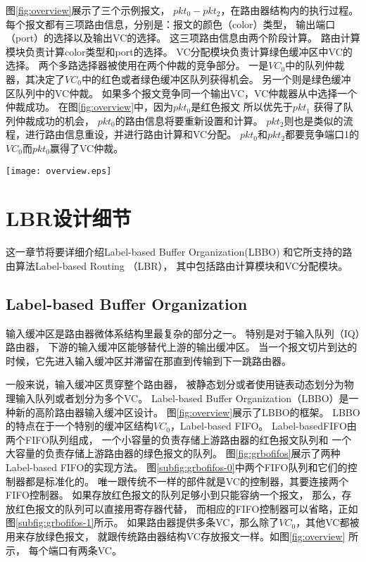 图\ref{fig:overview}展示了三个示例报文，
$pkt_0-pkt_2$，在路由器结构内的执行过程。
每个报文都有三项路由信息，分别是：报文的颜色（color）类型，
输出端口（port）的选择以及输出VC的选择。
这三项路由信息由两个阶段计算。
路由计算模块负责计算color类型和port的选择。
VC分配模块负责计算绿色缓冲区中VC的选择。
两个多路选择器被使用在两个仲裁的竞争部分。
一是$VC_0$中的队列仲裁器，其决定了$VC_0$中的红色或者绿色缓冲区队列获得机会。
另一个则是绿色缓冲区队列中的VC仲裁。
如果多个报文竞争同一个输出VC，VC仲裁器从中选择一个仲裁成功。
在图\ref{fig:overview}中，因为$pkt_0$是红色报文
所以优先于$pkt_1$ 获得了队列仲裁成功的机会，
$pkt_0$的路由信息将要重新设置和计算。
$pkt_2$则也是类似的流程，进行路由信息重设，并进行路由计算和VC分配。
$pkt_0$和$pkt_2$都要竞争端口1的$VC_0$而$pkt_0$赢得了VC仲裁。

\begin{figure*}[t]
  \centering
  \texttt{[image: overview.eps]}
  \caption{LBBO结构和LBR的工作流程}
  \label{fig:overview}
\end{figure*}

\section{LBR设计细节}

这一章节将要详细介绍Label-based Buffer Organization(LBBO)
和它所支持的路由算法Label-based Routing （LBR），
其中包括路由计算模块和VC分配模块。

\subsection{Label-based Buffer Organization}

输入缓冲区是路由器微体系结构里最复杂的部分之一。
特别是对于输入队列（IQ）路由器，
下游的输入缓冲区能够替代上游的输出缓冲区。
当一个报文切片到达的时候，它先进入输入缓冲区并滞留在那直到传输到下一跳路由器。

一般来说，输入缓冲区贯穿整个路由器，
被静态划分或者使用链表动态划分为物理输入队列或者划分为多个VC。
Label-based Buffer Organization（LBBO）是一种新的高阶路由器输入缓冲区设计。
图\ref{fig:overview}展示了LBBO的框架。
LBBO的特点在于一个特别的缓冲区结构$VC_0$，Label-based FIFO。
Label-basedFIFO由两个FIFO队列组成，
一个小容量的负责存储上游路由器的红色报文队列和
一个大容量的负责存储上游路由器的绿色报文的队列。
图\ref{fig:grbofifos}展示了两种Label-based FIFO的实现方法。
图\ref{subfig:grbofifos-0}中两个FIFO队列和它们的控制器都是标准化的。
唯一跟传统不一样的部件就是VC的控制器，其要连接两个FIFO控制器。
如果存放红色报文的队列足够小到只能容纳一个报文，
那么，存放红色报文的队列可以直接用寄存器代替，
而相应的FIFO控制器可以省略，正如图\ref{subfig:grbofifos-1}所示。
如果路由器提供多条VC，那么除了$VC_0$，其他VC都被用来存放绿色报文，
就跟传统路由器结构VC存放报文一样。如图\ref{fig:overview} 所示，
每个端口有两条VC。

